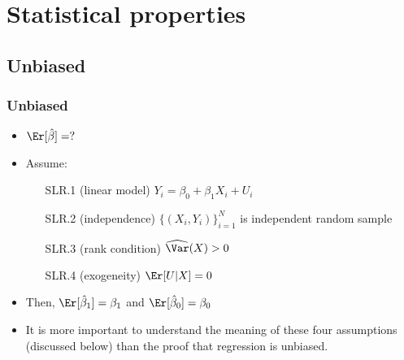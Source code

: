 \section{Statistical properties}

\subsection{Unbiased}
\begin{frame}[allowframebreaks]
  \frametitle{Unbiased}
  \begin{itemize}
  \item $\Er[\hat{\beta}] = ?$
  \item Assume:
    \begin{enumerate}
    \item[SLR.1]\label{s1} (linear model) $ Y_i = \beta_0 + \beta_1
      X_i + U_i $
    \item[SLR.2]\label{s2} (independence) $\{(X_i,Y_i)\}_{i=1}^N$ is independent random
      sample
    \item[SLR.3]\label{s3} (rank condition) $\widehat{\Var}(X) > 0$
    \item[SLR.4]\label{s4} (exogeneity) $\Er[U | X] = 0$
    \end{enumerate}
  \item Then, $\Er[\hat{\beta}_1] = \beta_1$ and $\Er[\hat{\beta}_0] = \beta_0$
\item It is more important to understand the meaning of these four
assumptions (discussed below) than the proof that regression is
unbiased.    
\end{itemize}
\end{frame}

